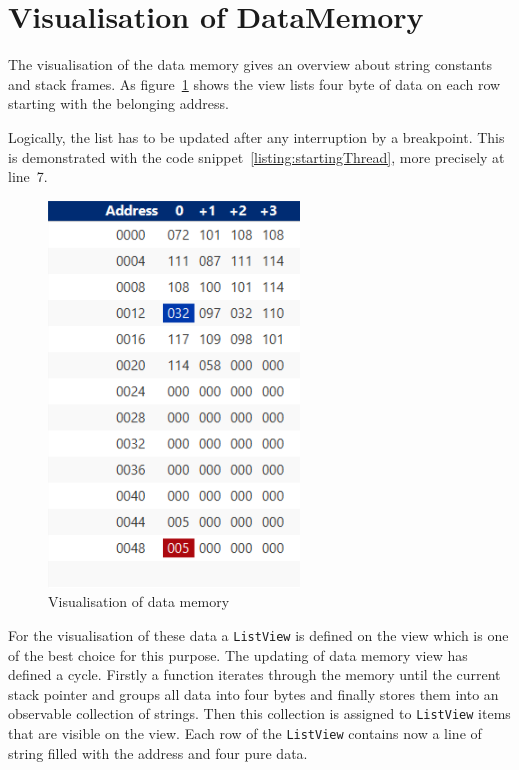 \section{Visualisation of DataMemory}
\label{sec:implementationOfDataVisualisation}
The visualisation of the data memory gives an overview about string constants and stack frames. As figure~\ref{fig:dataMemoryView} shows the view lists four byte of data on each row starting with the belonging address. 

Logically, the list has to be updated after any interruption by a breakpoint. This is demonstrated with the code snippet~\ref{listing:startingThread}, more precisely at line~7.

\begin{figure}[h] 
	\centering
	\includegraphics[scale=.99]{images/dataMemory.png}
	\caption{Visualisation of data memory}
	\label{fig:dataMemoryView}
\end{figure}

For the visualisation of these data a \lstinline$ListView$ is defined on the view which is one of the best choice for this purpose. 
The updating of data memory view has defined a cycle. Firstly a function iterates through the memory until the current stack pointer and groups all data into four bytes and finally stores them into an observable collection of strings. Then this collection is assigned to \lstinline$ListView$ items that are visible on the view. Each row of the \lstinline$ListView$ contains now a line of string filled with the address and four pure data. 

